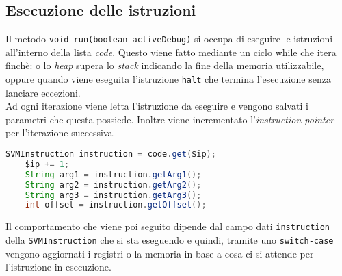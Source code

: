 \documentclass[../report.tex]{subfiles}
\begin{document}
\subsection{Esecuzione delle istruzioni}
Il metodo \verb|void run(boolean activeDebug)| si occupa di eseguire le istruzioni all'interno della lista \textit{code}. Questo viene fatto mediante un ciclo while che itera finch\`e: o lo \textit{heap} supera lo \textit{stack} indicando la fine della memoria utilizzabile, oppure quando viene eseguita l'istruzione \verb|halt| che termina l'esecuzione senza lanciare eccezioni.\\
Ad ogni iterazione viene letta l'istruzione da eseguire e vengono salvati i parametri che questa possiede. Inoltre viene incrementato l'\textit{instruction pointer} per l'iterazione successiva.
\begin{lstlisting}[language=Java]
    SVMInstruction instruction = code.get($ip);
    $ip += 1;
    String arg1 = instruction.getArg1();
    String arg2 = instruction.getArg2();
    String arg3 = instruction.getArg3();
    int offset = instruction.getOffset();
\end{lstlisting}
Il comportamento che viene poi seguito dipende dal campo dati \verb|instruction| della \verb|SVMInstruction| che si sta eseguendo e quindi, tramite uno \verb|switch-case| vengono aggiornati i registri o la memoria in base a cosa ci si attende per l'istruzione in esecuzione.
\end{document}
